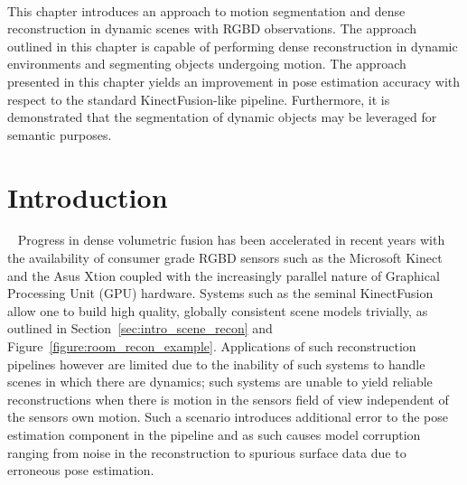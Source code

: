 ~\label{chap:moseg}
\begin{chapterabstract}
This chapter introduces an approach to motion segmentation and dense reconstruction 
in dynamic scenes with RGBD observations. The approach outlined in this chapter is 
capable of performing dense reconstruction in dynamic environments and segmenting objects 
undergoing motion. The approach presented in this chapter yields an improvement in pose 
estimation accuracy with respect to the standard KinectFusion-like pipeline. Furthermore, 
it is demonstrated that the segmentation of dynamic objects may be leveraged for semantic 
purposes.
\end{chapterabstract}

\section{Introduction}
~\label{sec:moseg_introduction}
Progress in dense volumetric fusion has been accelerated in recent years with
the availability of consumer grade RGBD sensors such as the Microsoft Kinect and
the Asus Xtion coupled with the increasingly parallel nature of Graphical Processing 
Unit (GPU) hardware. Systems such as the seminal KinectFusion~\cite{Newcombe2011} 
allow one to build high quality, globally consistent scene models trivially, as 
outlined in Section~\ref{sec:intro_scene_recon} and Figure~\ref{figure:room_recon_example}.
Applications of such reconstruction pipelines however are limited due to the 
inability of such systems to handle scenes in which there are dynamics; such 
systems are unable to yield reliable reconstructions when there is motion in the 
sensors field of view independent of the sensors own motion. Such a scenario introduces
additional error to the pose estimation component in the pipeline and as such
causes model corruption ranging from noise in the reconstruction to spurious 
surface data due to erroneous pose estimation.

